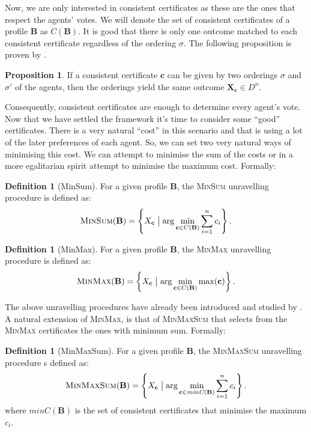 \documentclass[11pt,a4paper, titlepage]{article}
\theoremstyle{definition}
\newtheorem{definition}[theorem]{Definition}
\newtheorem{proposition}[theorem]{Proposition}
\let\vec\mathbf
\begin{document}
Now, we are only interested in consistent certificates as these are the ones that respect the agents' votes. We will denote the set of consistent certificates of a profile $\mathbf{B}$ as $C(\mathbf{B})$.
It is good that there is only one outcome matched to each consistent certificate regardless of the ordering $\sigma$. The following proposition is proven by \cite{grandi}.

\begin{proposition}
    If a consistent certificate $\mathbf{c}$ can be given by two orderings $\sigma$ and $\sigma'$ of the agents, then the orderings yield the same outcome $\vec{X}_\mathbf{c} \in D^n$.
\end{proposition}

Consequently, consistent certificates are enough to determine every agent's vote. 
Now that we have settled the framework it's time to consider some ``good'' certificates. 
There is a very natural ``cost'' in this scenario and that is using a lot of the later preferences of each agent. 
So, we can set two very natural ways of minimising this cost. 
We can attempt to minimise the sum of the costs or in a more egalitarian spirit attempt to minimise the maximum cost. 
Formally:

\begin{definition}[MinSum]
    For a given profile $\mathbf{B}$, the \textsc{MinSum} unravelling procedure is defined as:
    \[
        \textsc{MinSum}(\mathbf{B}) = 
        \left\{X_{\mathbf{c}} \bigm| \mathrm{arg} \min_{\mathbf{c} \in C(\mathbf{B})} \sum_{i=1}^n c_i\right\}.
    \]
\end{definition}

\begin{definition}[MinMax]
    For a given profile $\mathbf{B}$, the \textsc{MinMax} unravelling procedure is defined as:
    \[
        \textsc{MinMax}(\mathbf{B}) = \left\{X_{\mathbf{c}} \bigm| \mathrm{arg} \min_{\mathbf{c} \in C(\mathbf{B})} \max (\mathbf{c}) \right\}.
    \]
\end{definition}

The above unravelling procedures have already been introduced and studied by  \cite{grandi}. 
A natural extension of \textsc{MinMax}, is that of \textsc{MinMaxSum} that selects from the \textsc{MinMax} certificates the ones with minimum sum. 
Formally:

\begin{definition}[MinMaxSum]
    For a given profile $\mathbf{B}$, the \textsc{MinMaxSum} unravelling procedure s defined as:
    \[
        \textsc{MinMaxSum}(\mathbf{B}) =  \left\{ X_{\mathbf{c}} \bigm| \arg  \min_{\vec{c} \in \mathit{minC}(\mathbf{B})} \sum_{i=1}^n c_i \right\}.
    \]
    where $\mathit{minC}(\vec{B})$ is the set of consistent certificates that minimise the maximum $c_i$. 
\end{definition}
\end{document}
